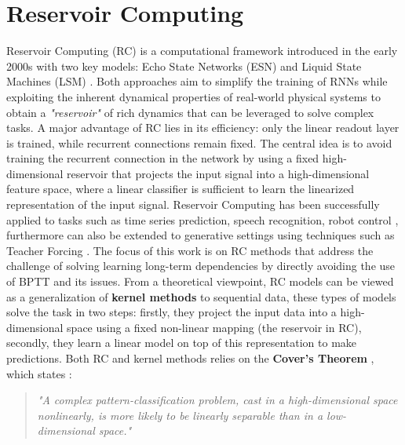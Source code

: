 \section{Reservoir Computing}
Reservoir Computing (RC) is a computational framework introduced in the early 2000s with two key models: Echo State Networks (ESN) \cite{jaeger2001echo} and
Liquid State Machines (LSM) \cite{fernando2003pattern}. Both approaches aim to simplify the training of RNNs while exploiting the inherent dynamical properties of real-world physical systems to
obtain a \textit{"reservoir"} of rich dynamics that can be leveraged to solve complex tasks. 
A major advantage of RC lies in its efficiency: only the linear readout layer is trained, while recurrent connections remain fixed.
\newline
The central idea is to avoid training the recurrent connection in the network by using a fixed high-dimensional reservoir that projects the input signal into a high-dimensional feature space,
where a linear classifier is sufficient to learn the linearized representation of the input signal. \newline
Reservoir Computing has been successfully applied to tasks such as time series prediction, speech recognition, robot control \cite{cucchi2022hands}, furthermore can also be extended to generative settings using techniques such as Teacher Forcing \cite{6795228}.\newline
\newline
The focus of this work is on RC methods that address the challenge of solving learning long-term dependencies by directly avoiding
the use of BPTT and its issues. From a theoretical viewpoint, RC models can be viewed as a generalization of \textbf{kernel methods} \cite[Ch. 5]{haykin2009neural} to sequential data,
 these types of models solve the task in two steps: firstly, they project the input data into a high-dimensional space using a fixed non-linear mapping (the reservoir in RC),
  secondly, they learn a linear model on top of this representation to make predictions.
 \newline
Both RC and kernel methods relies on the \textbf{Cover's Theorem} \cite{cover2006geometrical}, which states :
\begin{quote}
    \label{quote:cover}
    \textit{"A complex pattern-classification problem, cast in a high-dimensional space nonlinearly, is more likely to be linearly separable than in a low-dimensional space."}
\end{quote}

